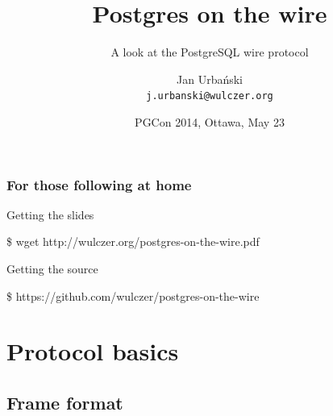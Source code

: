 \documentclass{beamer}
\title{Postgres on the wire}
\subtitle{A look at the PostgreSQL wire protocol}
\author[Jan Urbański]{Jan Urbański \\ \texttt{j.urbanski@wulczer.org}}
\institute{Ducksboard}
\date[PGCon 2014]{PGCon 2014, Ottawa, May 23}
\begin{document}
\frame{\titlepage}

\begin{frame}[fragile]
  \frametitle{For those following at home}

  \begin{block}{Getting the slides}
    \begin{semiverbatim}
    \$ wget http://wulczer.org/postgres-on-the-wire.pdf
    \end{semiverbatim}
  \end{block}

  \begin{block}{Getting the source}
    \begin{semiverbatim}
    \$ https://github.com/wulczer/postgres-on-the-wire
    \end{semiverbatim}
  \end{block}
\end{frame}

\begin{frame}[plain]
\end{frame}
\usebackgroundtemplate{}

\begin{frame}
  \tableofcontents
\end{frame}

\section{Protocol basics}
\subsection{Frame format}
\end{document}
